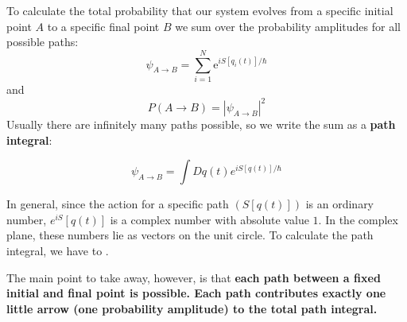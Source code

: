 To calculate the total probability that our system evolves from a specific initial point $A$ to a specific final point $B$ we sum over the probability amplitudes for all possible paths:
$$
\psi_{A \rightarrow B}=\sum_{i=1}^{N} \mathrm{e}^{i S\left[q_{i}(t)\right] / \hbar}
$$
and
$$
P(A \rightarrow B)=\left|\psi_{A \rightarrow B}\right|^{2}
$$
Usually there are infinitely many paths possible, so we write the sum as a \textbf{path integral}:
\begin{qt}
\begin{equation}
\psi_{A \rightarrow B}=\int D q(t) e^{i S[q(t)] / \hbar}
\end{equation}
\end{qt}
In general, since the action for a specific path $(S[q(t)])$ is an ordinary number, $e^{i S}[q(t)]$ is a complex number with absolute value $1 .$ In the complex plane, these numbers lie as vectors on the unit circle.  To calculate the path integral, we have to .

The main point to take away, however, is that \textbf{each path between a fixed initial and final point is possible. Each path contributes exactly one little arrow (one probability amplitude) to the total path integral.}